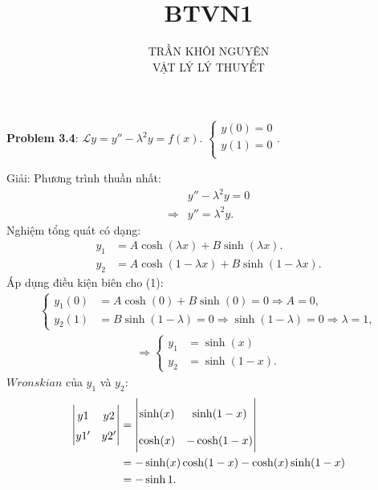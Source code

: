 \documentclass{article}
\title{\Huge{BTVN1}}
\begin{document}
\setlength{\parindent}{20pt}
\newpage
\author{TRẦN KHÔI NGUYÊN \\ VẬT LÝ LÝ THUYẾT}
\maketitle

\textbf{Problem 3.4}: $\mathcal{L}y = y'' - \lambda^2 y = f(x)$.
$
	\begin{cases}
		y(0) = 0 \\
		y(1) = 0 \\
	\end{cases}.
$

Giải:
Phương trình thuần nhất:
\begin{align*}
	            & y'' - \lambda^2 y = 0 \\
	\Rightarrow & y'' = \lambda^2 y.
\end{align*}
Nghiệm tổng quát có dạng:
\begin{align}
	y_1 & = A \cosh (\lambda x) + B \sinh (\lambda x).     \\
	y_2 & = A \cosh (1-\lambda x) + B \sinh (1-\lambda x).
\end{align}
Áp dụng	điều kiện biên cho (1):
\begin{align*}
	\begin{cases}
		y_1(0) & = A \cosh (0) + B \sinh (0) = 0 \Rightarrow A = 0,                                     \\
		y_2(1) & = B \sinh (1-\lambda ) = 0 \Rightarrow \sinh (1-\lambda ) = 0 \Rightarrow \lambda = 1,
	\end{cases}
\end{align*}
\begin{align}
	\Rightarrow
	\begin{cases}
		y_1 & = \sinh (x)    \\
		y_2 & = \sinh (1-x).
	\end{cases}
\end{align}
$Wronskian$ của $y_1$ và $y_2$:
\begin{align*}
	\renewcommand{\arraystretch}{1.5}
	\begin{vmatrix}
		y1  & y2  \\
		y1' & y2'
	\end{vmatrix}
	 & =
	\begin{vmatrix}\renewcommand{\arraystretch}{2}
		\sinh (x) & \sinh (1-x)  \\
		\cosh (x) & -\cosh (1-x)
	\end{vmatrix}      \\
	 & = 	-\sinh (x)\cosh (1-x) - \cosh (x) \sinh (1-x) \\
	 & = 	-\sinh 1.
\end{align*}
\end{document}
